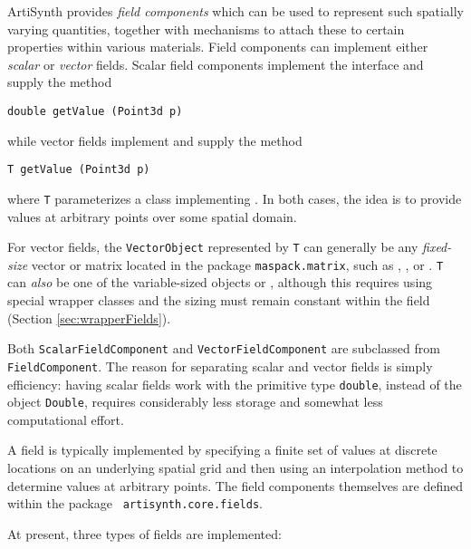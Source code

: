 ArtiSynth provides {\it field components} which can be used to
represent such spatially varying quantities, together with mechanisms
to attach these to certain properties within various materials.  Field
components can implement either {\it scalar} or {\it vector}
fields. Scalar field components implement the interface
 and supply
the method
%
\begin{lstlisting}[]
   double getValue (Point3d p)
\end{lstlisting}
%
while vector fields implement
and supply the method
%
\begin{lstlisting}[]
   T getValue (Point3d p)
\end{lstlisting}
%
where {\tt T} parameterizes a class implementing
.  In both cases, the idea is
to provide values at arbitrary points over some spatial domain.

For vector fields, the {\tt VectorObject} represented by {\tt T} can
generally be any {\it fixed-size} vector or matrix located in the
package {\tt maspack.matrix}, such as
,
, or
. {\tt T} can {\it also} be one of
the variable-sized objects  or
, although this requires using
special wrapper classes and the sizing must remain constant within the
field (Section \ref{sec:wrapperFields}).

\begin{sideblock}
Both {\tt ScalarFieldComponent} and {\tt VectorFieldComponent} are
subclassed from {\tt FieldComponent}. The reason for separating scalar
and vector fields is simply efficiency: having scalar fields work with
the primitive type {\tt double}, instead of the object {\tt Double},
requires considerably less storage and somewhat less computational
effort.
\end{sideblock}

A field is typically implemented by specifying a finite set of values
at discrete locations on an underlying spatial grid and then using an
interpolation method to determine values at arbitrary points. The
field components themselves are defined within the package {\tt
artisynth.core.fields}.

At present, three types of fields are implemented:

